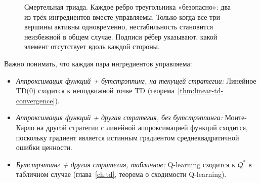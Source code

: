 \begin{figure}[ht]
\centering
{}
\caption{Смертельная триада. Каждое ребро треугольника «безопасно»: два
из трёх ингредиентов вместе управляемы. Только когда все три вершины
активны одновременно, нестабильность становится неизбежной в общем
случае. Подписи рёбер указывают, какой элемент отсутствует вдоль каждой
стороны.}
\label{fig:deadly-triad}
\end{figure}

Важно понимать, что каждая пара ингредиентов управляема:
\begin{itemize}[leftmargin=*]
\item \emph{Аппроксимация функций + бутстрэппинг, на текущей стратегии:} Линейное TD(0) сходится к неподвижной точке TD (теорема~\ref{thm:linear-td-convergence}).
\item \emph{Аппроксимация функций + другая стратегия, без бутстрэппинга:} Монте-Карло на другой стратегии с линейной аппроксимацией функций сходится, поскольку градиент является истинным градиентом среднеквадратичной ошибки ценности.
\item \emph{Бутстрэппинг + другая стратегия, табличное:} Q-learning сходится к $Q^*$ в табличном случае (глава~\ref{ch:td}, теорема о сходимости Q-learning).
\end{itemize}

